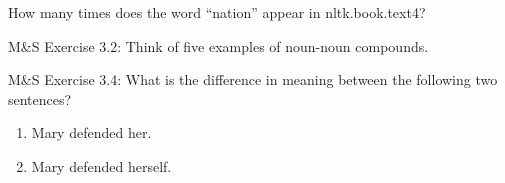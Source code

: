 \documentclass[11pt,letterpaper,boxed]{hmcpset}
\begin{document}
\begin{problem}
How many times does the word ``nation'' appear in nltk.book.text4?
\end{problem}

\begin{solution}
\end{solution}


\begin{problem}
M\&S Exercise 3.2: Think of five examples of noun-noun compounds.
\end{problem}

\begin{solution}
\vspace{3cm}
\end{solution}

\begin{problem}
M\&S Exercise 3.4: What is the difference in meaning between the
following two sentences?
\begin{enumerate}
    \item  Mary defended her.
    \item Mary defended herself.
\end{enumerate}
\end{problem}

\begin{solution}
\vspace{4cm}
\end{solution}
\end{document}
